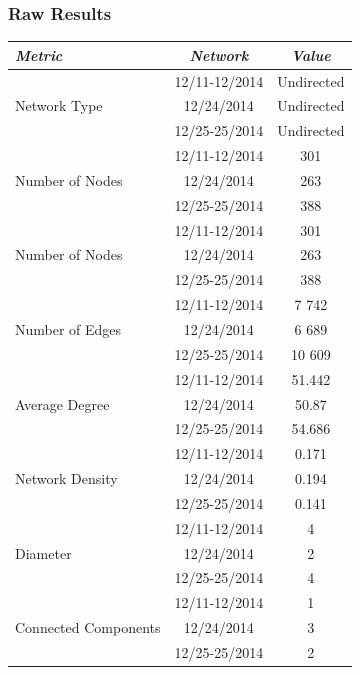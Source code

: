 \documentclass{llncs}
\begin{document}
\subsubsection{Raw Results}
\begin{center}
    \begin{tabular}{ l | c | c }
        \hline
        \textit{Metric} & \textit{Network} & \textit{Value} \\ \hline
        \multirow{3}{*}{Network Type} & 12/11-12/2014 & Undirected \\
                                      & 12/24/2014 & Undirected \\
                                      & 12/25-25/2014 & Undirected \\ \hline
        \multirow{3}{*}{Number of Nodes} & 12/11-12/2014 & 301 \\
                                      & 12/24/2014 & 263 \\
                                      & 12/25-25/2014 & 388 \\ \hline
        \multirow{3}{*}{Number of Nodes} & 12/11-12/2014 & 301 \\
                                      & 12/24/2014 & 263 \\
                                      & 12/25-25/2014 & 388 \\ \hline
        \multirow{3}{*}{Number of Edges} & 12/11-12/2014 & 7 742 \\
                                      & 12/24/2014 & 6 689 \\
                                      & 12/25-25/2014 & 10 609 \\ \hline
        \multirow{3}{*}{Average Degree} & 12/11-12/2014 & 51.442 \\
                                      & 12/24/2014 & 50.87 \\
                                      & 12/25-25/2014 & 54.686 \\ \hline
        \multirow{3}{*}{Network Density} & 12/11-12/2014 & 0.171 \\
                                      & 12/24/2014 & 0.194 \\
                                      & 12/25-25/2014 & 0.141 \\ \hline
        \multirow{3}{*}{Diameter} & 12/11-12/2014 & 4 \\
                                      & 12/24/2014 & 2 \\
                                      & 12/25-25/2014 & 4 \\ \hline
        \multirow{3}{*}{Connected Components} & 12/11-12/2014 & 1 \\
                                      & 12/24/2014 & 3 \\
                                      & 12/25-25/2014 & 2 \\ \hline
    \end{tabular}
\end{center}
%
\end{document}
